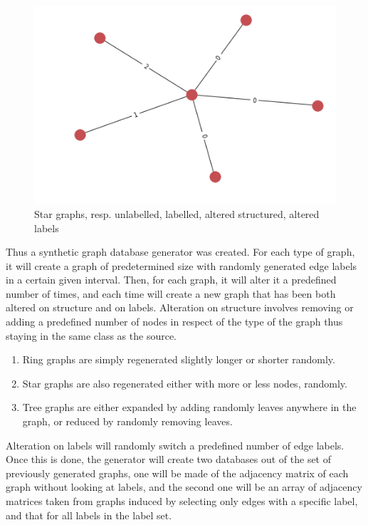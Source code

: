 \documentclass{article}
\theoremstyle{definition}
\begin{document}
\begin{figure}[!htb]
\begin{multicols}{4}
		\includegraphics[width=\linewidth]{data/generated-graphs/star_altered_labels.png}\par
	\end{multicols}
	\caption{Star graphs, resp. unlabelled, labelled, altered structured, altered labels}
\end{figure}
Thus a synthetic graph database generator was created. For each type of graph, it will create a graph of predetermined size with randomly generated edge labels in a certain given interval. Then, for each graph, it will alter it a predefined number of times, and each time will create a new graph that has been both altered on structure and on labels. Alteration on structure involves removing or adding a predefined number of nodes in respect of the type of the graph thus staying in the same class as the source. 
\begin{enumerate}
	\item Ring graphs are simply regenerated slightly longer or shorter randomly.
	\item Star graphs are also regenerated either with more or less nodes, randomly.
	\item Tree graphs are either expanded by adding randomly leaves anywhere in the graph, or reduced by randomly removing leaves.
\end{enumerate}
Alteration on labels will randomly switch a predefined number of edge labels. Once this is done, the generator will create two databases out of the set of previously generated graphs, one will be made of the adjacency matrix of each graph without looking at labels, and the second one will be an array of adjacency matrices taken from graphs induced by selecting only edges with a specific label, and that for all labels in the label set.
\end{document}
